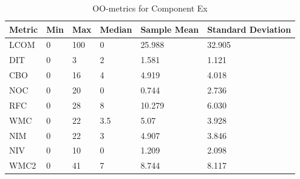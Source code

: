 \begin{table}[]
\centering
\caption{OO-metrics for Component Ex}
\label{tab:oometrics-ex}
\begin{tabular}{|l|l|l|l|l|l|}
\hline
\textbf{Metric} & \textbf{Min} & \textbf{Max} & \textbf{Median} & \textbf{Sample Mean} & \textbf{Standard Deviation} \\ \hline
LCOM            & 0           & 100          & 0               & 25.988               & 32.905                      \\ \hline
DIT             & 0            & 3            & 2               & 1.581                & 1.121                       \\ \hline
CBO             & 0            & 16           & 4               & 4.919                & 4.018                       \\ \hline
NOC             & 0            & 20           & 0               & 0.744                & 2.736                       \\ \hline
RFC             & 0            & 28           & 8               & 10.279               & 6.030                       \\ \hline
WMC             & 0            & 22           & 3.5             & 5.07                 & 3.928                       \\ \hline
NIM             & 0            & 22           & 3               & 4.907                & 3.846                       \\ \hline
NIV             & 0            & 10           & 0               & 1.209                & 2.098                       \\ \hline
WMC2            & 0            & 41          & 7              & 8.744                 & 8.117                      \\ \hline
\end{tabular}
\end{table}


